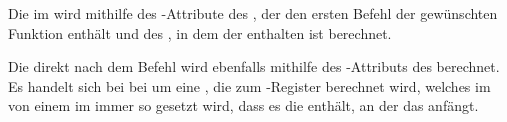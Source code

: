 Die   im   wird mithilfe des -Attribute des , der den ersten Befehl der gewünschten Funktion enthält und des , in dem der   enthalten ist berechnet.

Die   direkt nach dem Befehl  wird ebenfalls mithilfe des -Attributs des  berechnet. Es handelt sich bei bei  um eine , die  zum -Register berechnet wird, welches im  von einem  im  immer so gesetzt wird, dass es die  enthält, an der das  anfängt.


